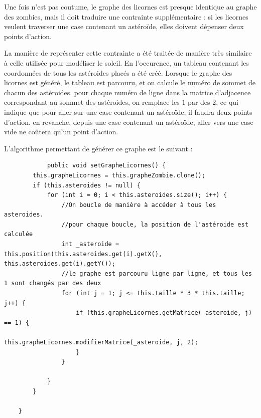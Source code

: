 \documentclass{report}
\begin{document}
			Une fois n'est pas coutume, le graphe des licornes est presque identique au graphe des zombies, mais il doit traduire une contrainte supplémentaire : si les licornes veulent traverser une case contenant un astéroïde, elles doivent dépenser deux points d'action.
			
			La manière de représenter cette contrainte a été traitée de manière très similaire à celle utilisée pour modéliser le soleil. En l'occurence, un tableau contenant les coordonnées de tous les astéroides placés a été créé. Lorsque le graphe des licornes est généré, le tableau est parcouru, et on calcule le numéro de sommet de chacun des astéroides. pour chaque numéro de ligne dans la matrice d'adjacence correspondant au sommet des astéroides, on remplace les $1$ par des $2$, ce qui indique que pour aller sur une case contenant un astéroïde, il faudra deux points d'action. en revanche, depuis une case contenant un astéroïde, aller vers une case vide ne coûtera qu'un point d'action.
			
			L'algorithme permettant de générer ce graphe est le suivant :\\
			\begin{verbatim}
			public void setGrapheLicornes() {
        this.grapheLicornes = this.grapheZombie.clone();
        if (this.asteroides != null) {
            for (int i = 0; i < this.asteroides.size(); i++) {
                //On boucle de manière à accéder à tous les asteroides.
                //pour chaque boucle, la position de l'astéroide est calculée
                int _asteroide = this.position(this.asteroides.get(i).getX(), this.asteroides.get(i).getY());
                //le graphe est parcouru ligne par ligne, et tous les 1 sont changés par des deux
                for (int j = 1; j <= this.taille * 3 * this.taille; j++) {
                    if (this.grapheLicornes.getMatrice(_asteroide, j) == 1) {
                        this.grapheLicornes.modifierMatrice(_asteroide, j, 2);
                    }
                }

            }
        }

    }
			\end{verbatim}
			
\end{document}

